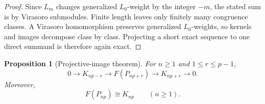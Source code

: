 \documentclass[12pt,leqno]{amsart}
\numberwithin{equation}{section}
\newtheorem{prop}[thm]{Proposition}
\begin{document}
\begin{proof}
Since $L_m$ changes generalized $L_0$-weight by the integer $-m$, the stated
sum is by Virasoro submodules.  Finite length leaves only finitely many
congruence classes.  A Virasoro homomorphism preserves generalized
$L_0$-weights, so kernels and images decompose class by class.  Projecting a
short exact sequence to one direct summand is therefore again exact.
\end{proof}

\begin{prop}[Projective-image theorem]\label{prop:projective-images}
For $n\geq1$ and $1\leq r\leq p-1$,
\begin{equation}\label{eq:F-projective-filtration}
 0\longrightarrow K_{np-r}\longrightarrow F(P_{np+r})
 \longrightarrow K_{np+r}\longrightarrow0.
\end{equation}
Moreover,
\begin{equation}\label{eq:F-wall-projective}
 F(P_{np})\cong K_{np}
 \qquad(n\geq1).
\end{equation}
\end{prop}
\end{document}
